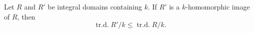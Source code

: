 Let $R$ and $R'$ be integral domains containing $k$. If $R'$ is a $k$-homomorphic image of $R$, then
$$\operatorname{tr.d.} R'/k \leq \operatorname{tr.d.} R/k.$$
